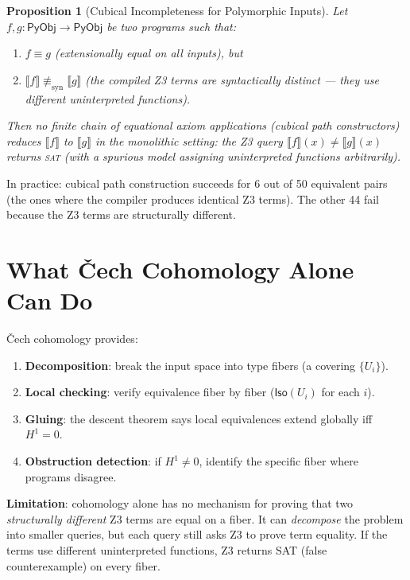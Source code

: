 \documentclass[11pt,a4paper]{report}
\theoremstyle{definition}
\theoremstyle{plain}
\newtheorem{proposition}[definition]{Proposition}
\newcommand{\den}[1]{\llbracket #1 \rrbracket}
\newcommand{\PyObj}{\mathsf{PyObj}}
\newcommand{\Iso}{\mathsf{Iso}}
\newcommand{\Hone}{H^1}
\begin{document}
\begin{proposition}[Cubical Incompleteness for Polymorphic Inputs]
\label{prop:cubical-incomplete}
Let $f, g : \PyObj \to \PyObj$ be two programs such that:
\begin{enumerate}
  \item $f \equiv g$ (extensionally equal on all inputs), but
  \item $\den{f} \not\equiv_{\mathrm{syn}} \den{g}$ (the compiled Z3
    terms are syntactically distinct --- they use different
    uninterpreted functions).
\end{enumerate}
Then no finite chain of equational axiom applications (cubical path
constructors) reduces $\den{f}$ to $\den{g}$ in the monolithic
setting: the Z3 query $\den{f}(x) \neq \den{g}(x)$ returns
\textsc{sat} (with a spurious model assigning uninterpreted functions
arbitrarily).
\end{proposition}

In practice: cubical path construction succeeds for 6 out of 50
equivalent pairs (the ones where the compiler produces identical Z3
terms).  The other 44 fail because the Z3 terms are structurally
different.

\section{What \v{C}ech Cohomology Alone Can Do}

\v{C}ech cohomology provides:
\begin{enumerate}
  \item \textbf{Decomposition}: break the input space into type fibers
    (a covering $\{U_i\}$).
  \item \textbf{Local checking}: verify equivalence fiber by fiber
    ($\Iso(U_i)$ for each $i$).
  \item \textbf{Gluing}: the descent theorem says local equivalences
    extend globally iff $\Hone = 0$.
  \item \textbf{Obstruction detection}: if $\Hone \neq 0$, identify
    the specific fiber where programs disagree.
\end{enumerate}

\textbf{Limitation}: cohomology alone has no mechanism for proving
that two \emph{structurally different} Z3 terms are equal on a fiber.
It can \emph{decompose} the problem into smaller queries, but each
query still asks Z3 to prove term equality.  If the terms use different
uninterpreted functions, Z3 returns SAT (false counterexample) on
every fiber.
\end{document}
